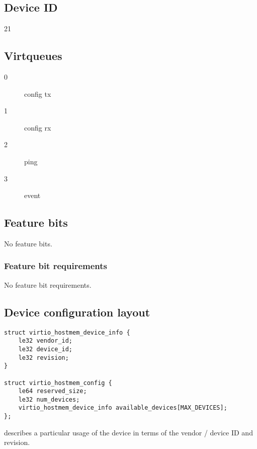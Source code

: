 \subsection{Device ID}\label{sec:Device Types / Host Memory Device / Device ID}

21

\subsection{Virtqueues}\label{sec:Device Types / Host Memory Device / Virtqueues}

\begin{description}
\item[0] config tx
\item[1] config rx
\item[2] ping
\item[3] event
\end{description}

\subsection{Feature bits}\label{sec: Device Types / Host Memory Device / Feature bits }

No feature bits.

\subsubsection{Feature bit requirements}\label{sec:Device Types / Host Memory Device / Feature bit requirements}

No feature bit requirements.

\subsection{Device configuration layout}\label{sec:Device Types / Host Memory Device / Device configuration layout}

\begin{lstlisting}
struct virtio_hostmem_device_info {
    le32 vendor_id;
    le32 device_id;
    le32 revision;
}

struct virtio_hostmem_config {
    le64 reserved_size;
    le32 num_devices;
    virtio_hostmem_device_info available_devices[MAX_DEVICES];
};
\end{lstlisting}

 describes a particular usage of the device
in terms of the vendor / device ID and revision.

